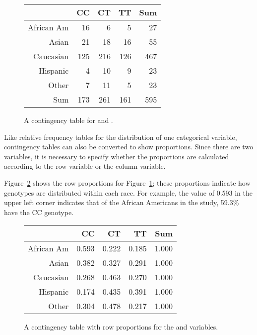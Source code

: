 \begin{figure}[ht]
	\centering
	\begin{tabular}{rrrrr}
		\hline
		& CC & CT & TT & Sum \\ 
		\hline
		African Am & 16 & 6 & 5 & 27 \\ 
		Asian & 21 & 18 & 16 & 55 \\ 
		Caucasian & 125 & 216 & 126 & 467 \\ 
		Hispanic & 4 & 10 & 9 & 23 \\ 
		Other & 7 & 11 & 5 & 23 \\ 
		Sum & 173 & 261 & 161 & 595 \\ 
		\hline
	\end{tabular}
	\caption{A contingency table for  and .} 
	\label{famussContingencyTable}
\end{figure}

\textD{\newpage}

Like relative frequency tables for the distribution of one categorical variable, contingency tables can also be converted to show proportions. Since there are two variables, it is necessary to specify whether the proportions are calculated according to the row variable or the column variable. 

Figure~\ref{famussRowPropTable} shows the row proportions for Figure~\ref{famussContingencyTable}; these proportions indicate how genotypes are distributed within each race. For example, the value of 0.593 in the upper left corner indicates that of the African Americans in the study, 59.3\% have the CC genotype.


\begin{figure}[ht]
	\centering
	\begin{tabular}{rrrrr}
		\hline
		& CC & CT & TT & Sum \\ 
		\hline
		African Am & 0.593 & 0.222 & 0.185 & 1.000 \\ 
		Asian & 0.382 & 0.327 & 0.291 & 1.000 \\ 
		Caucasian & 0.268 & 0.463 & 0.270 & 1.000 \\ 
		Hispanic & 0.174 & 0.435 & 0.391 & 1.000 \\ 
		Other & 0.304 & 0.478 & 0.217 & 1.000 \\ 
		\hline
	\end{tabular}
	\caption{A contingency table with row proportions for the  and  variables.} 
	\label{famussRowPropTable}
\end{figure}

